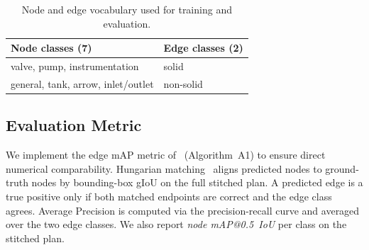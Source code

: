 \begin{table}[h]
\centering
\caption{Node and edge vocabulary used for training and evaluation.}
\label{tab:classes}
\small
\begin{tabular}{ll}
\toprule
\textbf{Node classes (7)} & \textbf{Edge classes (2)} \\
\midrule
valve, pump, instrumentation & solid \\
general, tank, arrow, inlet/outlet & non-solid \\
\bottomrule
\end{tabular}
\end{table}

\subsection{Evaluation Metric}
\label{sec:method:metric}

We implement the edge mAP metric of~\cite{sturmer2025} (Algorithm~A1)
to ensure direct numerical comparability.
Hungarian matching~\cite{kuhn1955} aligns predicted nodes to
ground-truth nodes by bounding-box gIoU on the full stitched plan.
A predicted edge is a true positive only if both matched endpoints are
correct and the edge class agrees.
Average Precision is computed via the precision-recall curve and averaged
over the two edge classes.
We also report \textit{node mAP@0.5~IoU} per class on the stitched plan.
